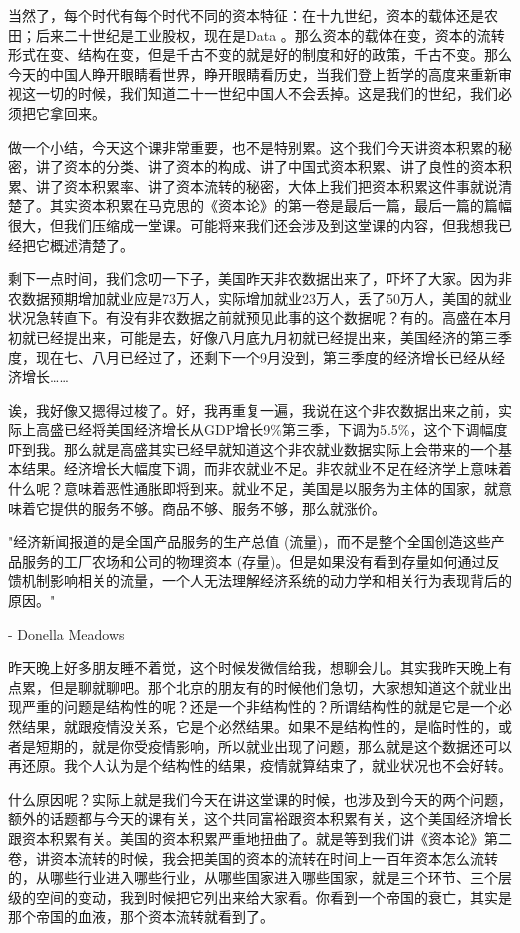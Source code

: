 \documentclass[UTF8, 12pt, a4paper]{ctexrep}
\begin{document}
当然了，每个时代有每个时代不同的资本特征：在十九世纪，资本的载体还是农田；后来二十世纪是工业股权，现在是Data 。那么资本的载体在变，资本的流转形式在变、结构在变，但是千古不变的就是好的制度和好的政策，千古不变。那么今天的中国人睁开眼睛看世界，睁开眼睛看历史，当我们登上哲学的高度来重新审视这一切的时候，我们知道二十一世纪中国人不会丢掉。这是我们的世纪，我们必须把它拿回来。

做一个小结，今天这个课非常重要，也不是特别累。这个我们今天讲资本积累的秘密，讲了资本的分类、讲了资本的构成、讲了中国式资本积累、讲了良性的资本积累、讲了资本积累率、讲了资本流转的秘密，大体上我们把资本积累这件事就说清楚了。其实资本积累在马克思的《资本论》的第一卷是最后一篇，最后一篇的篇幅很大，但我们压缩成一堂课。可能将来我们还会涉及到这堂课的内容，但我想我已经把它概述清楚了。

剩下一点时间，我们念叨一下子，美国昨天非农数据出来了，吓坏了大家。因为非农数据预期增加就业应是73万人，实际增加就业23万人，丢了50万人，美国的就业状况急转直下。有没有非农数据之前就预见此事的这个数据呢？有的。高盛在本月初就已经提出来，可能是去，好像八月底九月初就已经提出来，美国经济的第三季度，现在七、八月已经过了，还剩下一个9月没到，第三季度的经济增长已经从经济增长……

诶，我好像又摁得过梭了。好，我再重复一遍，我说在这个非农数据出来之前，实际上高盛已经将美国经济增长从GDP增长9\%第三季，下调为5.5\%，这个下调幅度吓到我。那么就是高盛其实已经早就知道这个非农就业数据实际上会带来的一个基本结果。经济增长大幅度下调，而非农就业不足。非农就业不足在经济学上意味着什么呢？意味着恶性通胀即将到来。就业不足，美国是以服务为主体的国家，就意味着它提供的服务不够。商品不够、服务不够，那么就涨价。

{\kaishu  "经济新闻报道的是全国产品服务的生产总值 (流量)，而不是整个全国创造这些产品服务的工厂农场和公司的物理资本 (存量)。但是如果没有看到存量如何通过反馈机制影响相关的流量，一个人无法理解经济系统的动力学和相关行为表现背后的原因。" }

{\kaishu - Donella Meadows}

昨天晚上好多朋友睡不着觉，这个时候发微信给我，想聊会儿。其实我昨天晚上有点累，但是聊就聊吧。那个北京的朋友有的时候他们急切，大家想知道这个就业出现严重的问题是结构性的呢？还是一个非结构性的？所谓结构性的就是它是一个必然结果，就跟疫情没关系，它是个必然结果。如果不是结构性的，是临时性的，或者是短期的，就是你受疫情影响，所以就业出现了问题，那么就是这个数据还可以再还原。我个人认为是个结构性的结果，疫情就算结束了，就业状况也不会好转。

什么原因呢？实际上就是我们今天在讲这堂课的时候，也涉及到今天的两个问题，额外的话题都与今天的课有关，这个共同富裕跟资本积累有关，这个美国经济增长跟资本积累有关。美国的资本积累严重地扭曲了。就是等到我们讲《资本论》第二卷，讲资本流转的时候，我会把美国的资本的流转在时间上一百年资本怎么流转的，从哪些行业进入哪些行业，从哪些国家进入哪些国家，就是三个环节、三个层级的空间的变动，我到时候把它列出来给大家看。你看到一个帝国的衰亡，其实是那个帝国的血液，那个资本流转就看到了。
\end{document}
